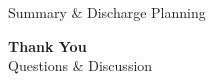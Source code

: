 \documentclass[10pt,aspectratio=169]{beamer}
\begin{document}
\begin{frame}{Summary \& Discharge Planning}
  \vspace{0.4cm}

  \begin{center}
    \begin{tcolorbox}[darkcta]
      \centering\color{white}\textbf{\large Thank You}\\[2pt]
      {\small Questions \& Discussion}
    \end{tcolorbox}
  \end{center}
\end{frame}
\end{document}
